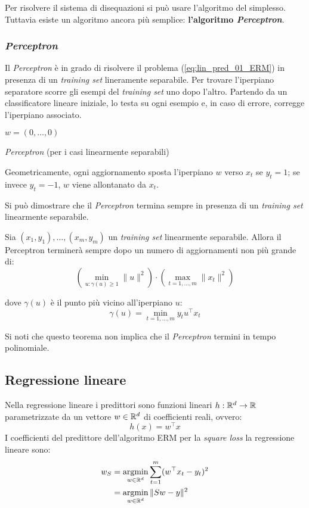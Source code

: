 Per risolvere il sistema di disequazioni si può usare l'algoritmo del
simplesso. Tuttavia esiste un algoritmo ancora più semplice: 
\textbf{l'algoritmo \textit{Perceptron}}.

\subsubsection{\textit{Perceptron}}
Il \textit{Perceptron} è in grado di risolvere il problema 
(\ref{eq:lin_pred_01_ERM}) in presenza di un \textit{training set} 
lineramente separabile. Per trovare l'iperpiano separatore scorre gli esempi
del \textit{training set} uno dopo l'altro. Partendo da un classificatore
lineare iniziale, lo testa su ogni esempio e, in caso di errore, corregge
l'iperpiano associato.

\begin{algorithm}[h]
   \DontPrintSemicolon
   $w=(0,\dots,0)$\;
   \caption{\textit{Perceptron} (per i casi linearmente separabili)}
\end{algorithm}

Geometricamente, ogni aggiornamento sposta l'iperpiano $w$ verso $x_t$ se
$y_t=1$; se invece $y_t=-1$, $w$ viene allontanato da $x_t$.

Si può dimostrare che il \textit{Perceptron} termina sempre in presenza
di un \textit{training set} linearmente separabile.

\begin{theorem}
   Sia $(x_1,y_1),\dots,(x_m,y_m)$ un \textit{training set} linearmente
   separabile. Allora il Perceptron terminerà sempre dopo un numero di
   aggiornamenti non più grande di:
   $$ \left(\min_{\displaystyle u:\gamma(u)\geq1} \|u\|^2 \right)\cdot
      \left(\max_{\displaystyle t=1,\dots,m}\|x_t\|^2\right) $$

   dove $\gamma(u)$ è il punto più vicino all'iperpiano $u$:
   $$ \gamma(u) = \min_{t=1,\dots,m} y_t u^\top x_t $$
\end{theorem}

Si noti che questo teorema non implica che il \textit{Perceptron} termini
in tempo polinomiale.

\subsection{Regressione lineare}
Nella regressione lineare i predittori sono funzioni lineari
$h:\mathbb{R}^d\rightarrow\mathbb{R}$ parametrizzate da un vettore $w\in\mathbb{R}^d$ di
coefficienti reali, ovvero:
$$ h(x) = w^\top x $$
I coefficienti del predittore dell'algoritmo ERM per la \textit{square loss}
la regressione lineare sono:
$$ \begin{aligned}
   w_S &= \operatorname*{argmin}_{w\in\mathbb{R}^d}\sum_{t=1}^{m} (w^\top x_t - y_t)^2\\
   &= \operatorname*{argmin}_{w\in\mathbb{R}^d} \|Sw-y\|^2
   \end{aligned}
$$

